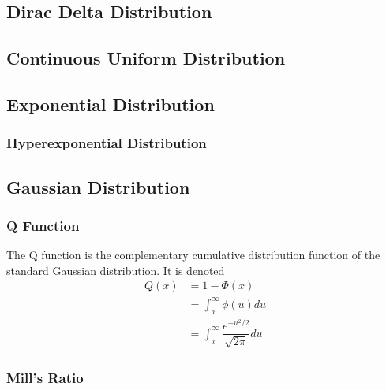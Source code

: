 \documentclass[11pt]{report} %
\begin{document}
\subsection{Dirac Delta Distribution}

\subsection{Continuous Uniform Distribution}

\subsection{Exponential Distribution}

\subsubsection{Hyperexponential Distribution}

\subsection{Gaussian Distribution}

\subsubsection{Q Function}

The Q function is the complementary cumulative distribution function of the standard Gaussian distribution. It is denoted
\begin{align}
Q\left(x\right) &= 1 - \Phi\left(x\right) \\
&= \int_{x}^{\infty}\phi\left(u\right)du \\
&= \int_{x}^{\infty}\dfrac{e^{-u^{2}/2}}{\sqrt{2\pi}}du
\end{align}

\subsubsection{Mill's Ratio}
\end{document}
